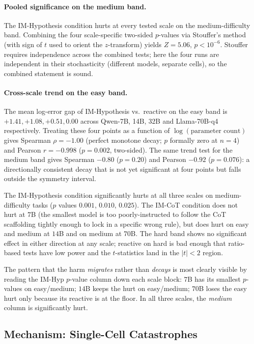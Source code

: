 \documentclass[11pt]{article}
\begin{document}
\paragraph{Pooled significance on the medium band.}
The IM-Hypothesis condition hurts at every tested scale on the
medium-difficulty band.  Combining the four scale-specific
two-sided $p$-values via Stouffer's method (with sign of $t$ used
to orient the $z$-transform) yields $Z = 5.06$, $p < 10^{-6}$.
Stouffer requires independence across the combined tests; here
the four runs are independent in their stochasticity (different
models, separate cells), so the combined statement is sound.

\paragraph{Cross-scale trend on the easy band.}
The mean log-error gap of IM-Hypothesis vs.\ reactive on the easy
band is $+1.41, +1.08, +0.51, 0.00$ across Qwen-7B, 14B, 32B and
Llama-70B-q4 respectively.  Treating these four points as a
function of $\log(\text{parameter count})$ gives Spearman
$\rho = -1.00$ (perfect monotone decay; $p$ formally zero at
$n = 4$) and Pearson $r = -0.998$ ($p = 0.002$, two-sided).
The same trend test for the medium band gives Spearman $-0.80$
($p = 0.20$) and Pearson $-0.92$ ($p = 0.076$): a directionally
consistent decay that is not yet significant at four points but
falls outside the symmetry interval.

The IM-Hypothesis condition significantly hurts at all three scales
on medium-difficulty tasks ($p$ values $0.001$, $0.010$, $0.025$).
The IM-CoT condition does not hurt at $7$B (the smallest model is too
poorly-instructed to follow the CoT scaffolding tightly enough to
lock in a specific wrong rule), but does hurt on easy and medium at
$14$B and on medium at $70$B.  The hard band shows no significant
effect in either direction at any scale; reactive on hard is bad
enough that ratio-based tests have low power and the $t$-statistics
land in the $|t| < 2$ region.

The pattern that the harm \emph{migrates} rather than \emph{decays}
is most clearly visible by reading the IM-Hyp $p$-value column down
each scale block: $7$B has its smallest $p$-values on easy/medium;
$14$B keeps the hurt on easy/medium; $70$B loses the easy hurt only
because its reactive is at the floor.  In all three scales, the
\emph{medium} column is significantly hurt.

\subsection{Mechanism: Single-Cell Catastrophes}
\label{sec:mechanism}
\end{document}
